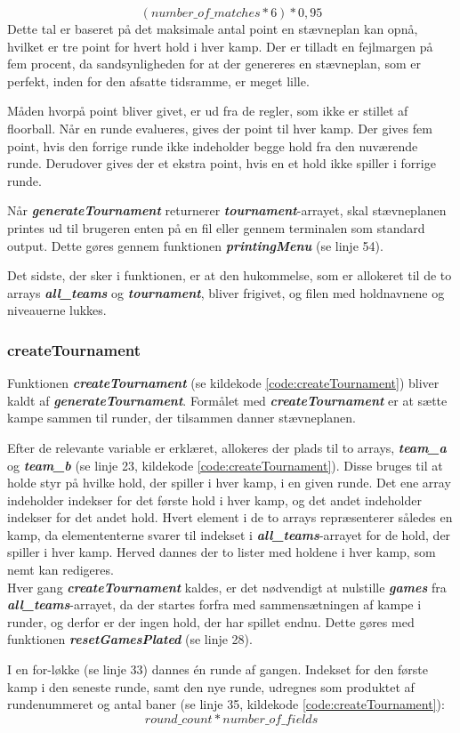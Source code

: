 \[(number\_of\_matches * 6) * 0,95\]
Dette tal er baseret på det maksimale antal point en stævneplan kan opnå, hvilket er tre point for hvert hold i hver kamp. Der er tilladt en fejlmargen på fem procent, da sandsynligheden for at der genereres en stævneplan, som er perfekt, inden for den afsatte tidsramme, er meget lille.
\par
Måden hvorpå point bliver givet, er ud fra de regler, som ikke er stillet af floorball. Når en runde evalueres, gives der point til hver kamp. Der gives fem point, hvis den forrige runde ikke indeholder begge hold fra den nuværende runde. Derudover gives der et ekstra point, hvis en et hold ikke spiller i forrige runde.
\par
Når \textbf{\textit{generateTournament}} returnerer \textbf{\textit{tournament}}-arrayet, skal stævneplanen printes ud til brugeren enten på en fil eller gennem terminalen som standard output. Dette gøres gennem funktionen \textbf{\textit{printingMenu}} (se linje 54).
\par
Det sidste, der sker i funktionen, er at den hukommelse, som er allokeret til de to arrays \textbf{\textit{all\_teams}} og \textbf{\textit{tournament}}, bliver frigivet, og filen med holdnavnene og niveauerne lukkes.

\subsubsection{createTournament}
Funktionen \textbf{\textit{createTournament}} (se kildekode \ref{code:createTournament}) bliver kaldt af \textbf{\textit{generateTournament}}. Formålet med \textbf{\textit{createTournament}} er at sætte kampe sammen til runder, der tilsammen danner stævneplanen.
\par
Efter de relevante variable er erklæret, allokeres der plads til to arrays, \textbf{\textit{team\_a}} og \textbf{\textit{team\_b}} (se linje 23, kildekode \ref{code:createTournament}). Disse bruges til at holde styr på hvilke hold, der spiller i hver kamp, i en given runde. Det ene array indeholder indekser for det første hold i hver kamp, og det andet indeholder indekser for det andet hold. Hvert element i de to arrays repræsenterer således en kamp, da elemententerne svarer til indekset i \textbf{\textit{all\_teams}}-arrayet for de hold, der spiller i hver kamp. Herved dannes der to lister med holdene i hver kamp, som nemt kan redigeres.
\\
Hver gang \textbf{\textit{createTournament}} kaldes, er det nødvendigt at nulstille \textbf{\textit{games}} fra \textbf{\textit{all\_teams}}-arrayet, da der startes forfra med sammensætningen af kampe i runder, og derfor er der ingen hold, der har spillet endnu. Dette gøres med funktionen \textbf{\textit{resetGamesPlated}} (se linje 28).
\par
I en for-løkke (se linje 33) dannes én runde af gangen. Indekset for den første kamp i den seneste runde, samt den nye runde, udregnes som produktet af rundenummeret og antal baner (se linje 35, kildekode \ref{code:createTournament}):
\[round\_count * number\_of\_fields\]

